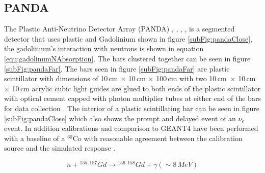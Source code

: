 \subsection{PANDA}
The Plastic Anti-Neutrino Detector Array (PANDA) \cite{PANDA_2012}, \cite{PANDA_2014}, \cite{PANDA_tgf}, \cite{IIRIE_Panda_2021}, is a segmented detector that uses plastic and Gadolinium shown in figure \ref{subFig:pandaClose}, the gadolinium's interaction with neutrons is shown in equation \ref{equ:gadolinumNAbsorption}. The bars clustered together can be seen in figure \ref{subFig:pandaFar}. The bars seen in figure \ref{subFig:pandaFar} are plastic scintillator with dimensions of 10\,cm $\times$ 10\,cm $\times$ 100\,cm with two 10\,cm\ $\times$ 10\,cm $\times$ 10\,cm acrylic cubic light guides are glued to both ends of the plastic scintillator with optical cement capped with photon multiplier tubes at either end of the bars for data collection \cite{PANDA_2014}. The interior of a plastic scintillating bar can be seen in figure \ref{subFig:pandaClose} which also shows the prompt and delayed event of an $\bar{\nu_e}$ event. In addition calibrations and comparison to GEANT4 \cite{Agostinelli:2002hh} have been performed with a baseline of a $^{60}$Co with reasonable agreement between the calibration source and the simulated response \cite{PANDA_2012}. 

\begin{equation}
n + {^{155,157}Gd} \rightarrow {^{156,158} Gd} + \gamma (\sim 8\,MeV)
\label{equ:gadolinumNAbsorption}
\end{equation}

